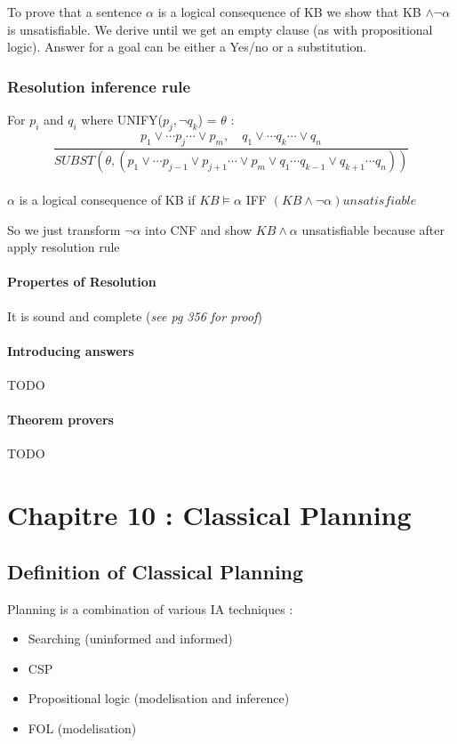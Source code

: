 To prove that a sentence $\alpha$ is a logical consequence of KB we show
that KB $\wedge\neg\alpha$  is unsatisfiable. We derive until  we get an
empty clause  (as with propositional  logic). Answer  for a goal  can be
either a Yes/no or a substitution.

\subsubsection{Resolution inference rule}
For $p_i$ and $q_i$ where UNIFY($p_j, \neg q_k$) = $\theta$ :
$$ \frac{p_1 \vee \cdots p_j \cdots \vee p_m, \quad q_1 \vee \cdots q_k \cdots \vee q_n}
{SUBST(\theta, (p_1 \vee \cdots p_{j-1} \vee p_{j+1} \cdots \vee p_m \vee q_1 \cdots q_{k-1} 
\vee q_{k+1} \cdots q_n))}$$

\paragraph{ } $\alpha$ is a logical consequence of KB if $KB \models \alpha$
IFF $(KB \wedge \neg \alpha) unsatisfiable$


So we just transform $\neg \alpha$ into CNF and show $KB \wedge \alpha$ unsatisfiable
because after apply resolution rule 

\paragraph{Propertes of Resolution} It is sound and complete (\textit{see pg 356 for proof}) 

\paragraph{Introducing answers}
TODO

\paragraph{Theorem provers} TODO

\section{Chapitre 10 : Classical Planning }

\subsection{Definition of Classical Planning}

Planning is a combination of various IA techniques :
\begin{multicols}{2}
\begin{itemize}
    \item Searching (uninformed and informed)
    \item CSP
    \item Propositional logic (modelisation and inference)
    \item FOL (modelisation)
\end{itemize}
\end{multicols}

